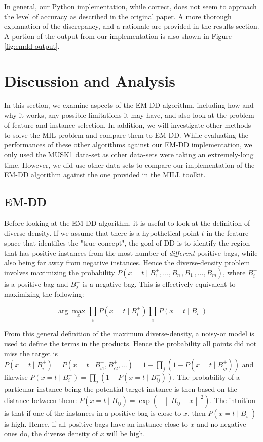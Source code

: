 \documentclass[conference]{IEEEtran}
\begin{document}
In general, our Python implementation, while correct, does not seem to approach the level of accuracy as described in the original paper. A more thorough explanation of the discrepancy, and a rationale are provided in the results section. A portion of the output from our implementation is also shown in Figure \ref{fig:emdd-output}.

\section{Discussion and Analysis}

In this section, we examine aspects of the EM-DD algorithm, including how and why it works, any possible limitations it may have, and also look at the problem of feature and instance selection. In addition, we will investigate other methods to solve the MIL problem and compare them to EM-DD. While evaluating the performances of these other algorithms against our EM-DD implementation, we only used the MUSK1 data-set as other data-sets were taking an extremely-long time. However, we did use other data-sets to compare our implementation of the EM-DD algorithm against the one provided in the MILL toolkit.

\subsection{EM-DD}

Before looking at the EM-DD algorithm, it is useful to look at the definition of diverse density. If we assume that there is a hypothetical point $t$ in the feature space that identifies the "true concept", the goal of DD is to identify the region that has positive instances from the most number of \textit{different} positive bags, while also being far away from negative instances. Hence the diverse-density problem involves maximizing the probability $P(x = t \mid B_1^+, \dots, B_n^+, B_1^-, \dots, B_m^-)$, where $B_i^+$ is a positive bag and $B_j^-$ is a negative bag. This is effectively equivalent to maximizing the following\cite{maron1998framework}:

\begin{equation}
\arg\max_x \prod_i P(x = t \mid B_i^+) \prod_i P(x = t \mid B_i^-)
\end{equation}

From this general definition of the maximum diverse-density, a noisy-or model is used to define the terms in the products. Hence the probability all points did not miss the target is $P(x = t \mid B_i^+) = P(x = t \mid B^+_{i1}, B^+_{i2}, \dots) = 1 - \prod_j(1 - P(x =t \mid B^+_{ij}))$ and likewise $P(x = t \mid B_i^-) = \prod_j(1 - P(x = t \mid B_{ij}^-))$. The probability of a particular instance being the potential target-instance is then based on the distance between them: $P(x = t \mid B_{ij}) = \exp(- \left\| B_{ij} - x \right\|^2)$. The intuition is that if one of the instances in a positive bag is close to $x$, then $P(x = t \mid B_i^+)$ is high. Hence, if all positive bags have an instance close to $x$ and no negative ones do, the diverse density of $x$ will be high. 
\end{document}
